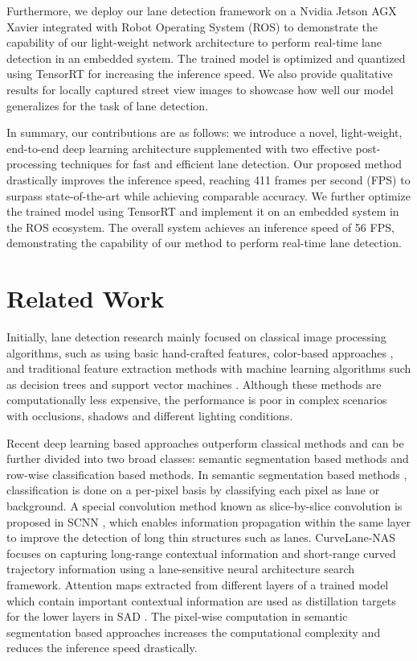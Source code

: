 \documentclass[conference]{IEEEtran}
\begin{document}
Furthermore, we deploy our lane detection framework on a Nvidia Jetson AGX Xavier integrated with Robot Operating System (ROS) \cite{ros} to demonstrate the capability of our light-weight network architecture to perform real-time lane detection in an embedded system. The trained model is optimized and quantized using TensorRT for increasing the inference speed. We also provide qualitative results for locally captured street view images to showcase how well our model generalizes for the task of lane detection.



In summary, our contributions are as follows: we introduce a novel, light-weight, end-to-end deep learning architecture supplemented with two effective post-processing techniques for fast and efficient lane detection. Our proposed method drastically improves the inference speed, reaching 411 frames per second (FPS) to surpass state-of-the-art while achieving comparable accuracy. We further optimize the trained model using TensorRT and implement it on an embedded system in the ROS ecosystem. The overall system achieves an inference speed of 56 FPS, demonstrating the capability of our method to perform real-time lane detection.


\section{Related Work}
\label{sec:related_works}
Initially, lane detection research mainly focused on classical image processing algorithms, such as using basic hand-crafted features\cite{kluge1995deform,yu1997lane,Ghazali2012road}, color-based approaches \cite{chiu2005lane,lee2009effective}, and traditional feature extraction methods with machine learning algorithms such as decision trees and support vector machines \cite{gonzalez2000lane,lanesvm2012}. Although these methods are computationally less expensive, the performance is poor in complex scenarios with occlusions, shadows and different lighting conditions.

Recent deep learning based approaches outperform classical methods and can be further divided into two broad classes: semantic segmentation based methods and row-wise classification based methods. In semantic segmentation based methods \cite{pan2018SCNN,CurveLane-NAS,hou2019learning}, classification is done on a per-pixel basis by classifying each pixel as lane or background. A special convolution method known as slice-by-slice convolution is proposed in SCNN \cite{pan2018SCNN}, which enables information propagation within the same layer to improve the detection of long thin structures such as lanes. CurveLane-NAS \cite{CurveLane-NAS} focuses on capturing long-range contextual information and short-range curved trajectory information using a lane-sensitive neural architecture search framework. Attention maps extracted from different layers of a trained model which contain important contextual information are used as distillation targets for the lower layers in SAD \cite{hou2019learning}. The pixel-wise computation in semantic segmentation based approaches increases the computational complexity and reduces the inference speed drastically.
\end{document}
